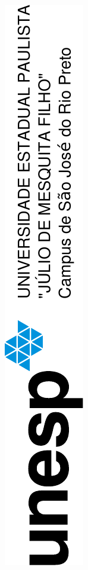 \documentclass[a4paper,12pt,openright,oneside]{book}
\begin{document}

	\thispagestyle{empty}

	\begin{center}

		\par \null

		\begin{figure}[H]

			\centering \includegraphics[angle=-90]{unesp.pdf}


\end{figure}
\end{center}
\end{document}
